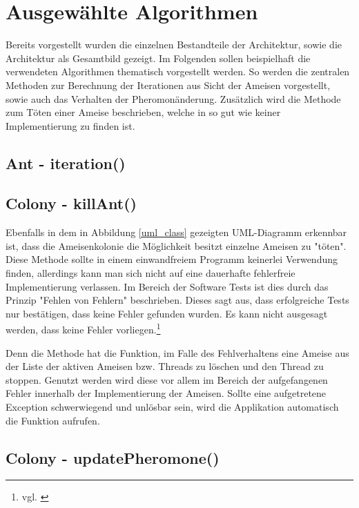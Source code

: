\section{Ausgewählte Algorithmen}{
	Bereits vorgestellt wurden die einzelnen Bestandteile der Architektur, sowie die Architektur als Gesamtbild gezeigt. Im Folgenden sollen beispielhaft die verwendeten Algorithmen thematisch vorgestellt werden. So werden die zentralen Methoden zur Berechnung der Iterationen aus Sicht der Ameisen vorgestellt, sowie auch das Verhalten der Pheromonänderung. Zusätzlich wird die Methode zum Töten einer Ameise beschrieben, welche in so gut wie keiner Implementierung zu finden ist.
	
	\subsection{Ant - iteration()}
	
	
	\subsection{Colony - killAnt()}
	Ebenfalls in dem in Abbildung \ref{uml_class} gezeigten UML-Diagramm erkennbar ist, dass die Ameisenkolonie die Möglichkeit besitzt einzelne Ameisen zu "töten". 
	Diese Methode sollte in einem einwandfreiem Programm keinerlei Verwendung finden, allerdings kann man sich nicht auf eine dauerhafte fehlerfreie Implementierung verlassen. Im Bereich der Software Tests ist dies durch das Prinzip "Fehlen von Fehlern" beschrieben. Dieses sagt aus, dass erfolgreiche Tests nur bestätigen, dass keine Fehler gefunden wurden. Es kann nicht ausgesagt werden, dass keine Fehler vorliegen.\footnote{vgl. \cite{bibid}}
	
	Denn die Methode hat die Funktion, im Falle des Fehlverhaltens eine Ameise aus der Liste der aktiven Ameisen bzw. Threads zu löschen und den Thread zu stoppen.
	Genutzt werden wird diese vor allem im Bereich der aufgefangenen Fehler innerhalb der Implementierung der Ameisen. Sollte eine aufgetretene Exception schwerwiegend und unlösbar sein, wird die Applikation automatisch die Funktion aufrufen.
	
	\subsection{Colony - updatePheromone()}
	
	
}